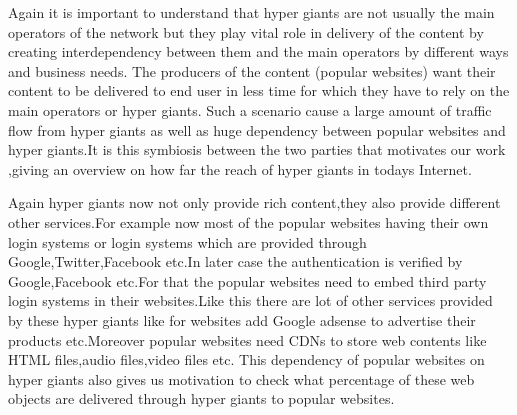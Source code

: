 Again it is important to understand that hyper giants are not usually the
main operators of the network but they play vital role in delivery of the content
by creating interdependency between them and the main operators by different
ways and business needs. The producers of the content (popular websites) want
their content to be delivered to end user in less time for which they have
to rely on the main operators or hyper giants. Such a scenario cause a large
amount of traffic flow from hyper giants as well as huge dependency between
popular websites and hyper giants.It is this symbiosis between the two parties
that motivates our work ,giving an overview on how far the reach of hyper giants
in todays Internet.

Again hyper giants now not only provide rich content,they also provide different other services.For example now most of the popular websites having their
own login systems or login systems which are provided through Google,Twitter,Facebook
etc.In later case the authentication is verified by Google,Facebook etc.For that
the popular websites need to embed third party login systems in their websites.Like this there are lot of other services provided by these hyper giants like
for websites add Google adsense to advertise their products etc.Moreover popular websites need CDNs to store web contents like HTML files,audio files,video files etc. This dependency of popular websites on hyper giants also gives us motivation to check what percentage of these web objects are delivered through hyper giants to popular websites.

